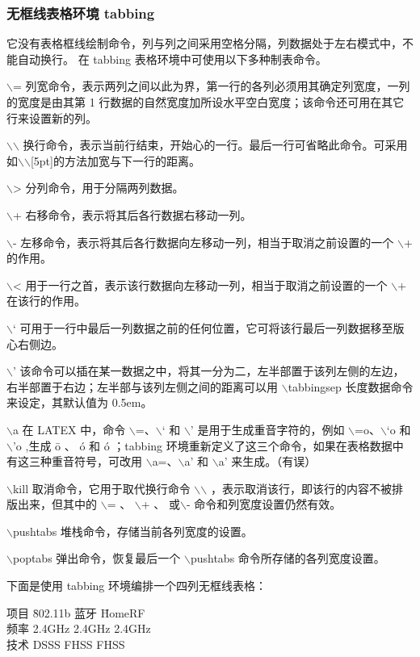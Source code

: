 \documentclass[presentation]{beamer}
\begin{document}
\begin{frame}[allowframebreaks]
  \frametitle{无框线表格环境 tabbing}%
它没有表格框线绘制命令，列与列之间采用空格分隔，列数据处于左右模式中，不能自动换行。
在 tabbing 表格环境中可使用以下多种制表命令。

$\backslash$=  列宽命令，表示两列之间以此为界，第一行的各列必须用其确定列宽度，一列的宽度是由其第 1 行数据的自然宽度加所设水平空白宽度；该命令还可用在其它行来设置新的列。

$\backslash$$\backslash$ 换行命令，表示当前行结束，开始心的一行。最后一行可省略此命令。可采用如$\backslash$$\backslash$[5pt]的方法加宽与下一行的距离。

$\backslash$>  分列命令，用于分隔两列数据。

$\backslash$+  右移命令，表示将其后各行数据右移动一列。

$\backslash$-  左移命令，表示将其后各行数据向左移动一列，相当于取消之前设置的一个 $\backslash$+ 的作用。

$\backslash$<  用于一行之首，表示该行数据向左移动一列，相当于取消之前设置的一个 $\backslash$+ 在该行的作用。

$\backslash$‘  可用于一行中最后一列数据之前的任何位置，它可将该行最后一列数据移至版心右侧边。

$\backslash$’  该命令可以插在某一数据之中，将其一分为二，左半部置于该列左侧的左边，右半部置于右边；左半部与该列左侧之间的距离可以用 $\backslash$tabbingsep 长度数据命令来设定，其默认值为 0.5em。

$\backslash$a  在 LATEX 中，命令 $\backslash$=、$\backslash$‘ 和 $\backslash$’ 是用于生成重音字符的，例如 $\backslash$=o、$\backslash$‘o 和 $\backslash$'o ,生成 \=o 、 \'o 和 \'o ；tabbing 环境重新定义了这三个命令，如果在表格数据中有这三种重音符号，可改用 $\backslash$a=、$\backslash$a’ 和 $\backslash$a’ 来生成。（有误）

$\backslash$kill  取消命令，它用于取代换行命令 $\backslash$$\backslash$ ，表示取消该行，即该行的内容不被排版出来，但其中的 $\backslash$= 、 $\backslash$+ 、 或$\backslash$- 命令和列宽度设置仍然有效。

$\backslash$pushtabs 堆栈命令，存储当前各列宽度的设置。

$\backslash$poptabs 弹出命令，恢复最后一个 $\backslash$pushtabs 命令所存储的各列宽度设置。

下面是使用 tabbing 环境编排一个四列无框线表格：
\begin{tabbing}
项目 \hspace{4mm} \= {\sf 802.11b} \hspace{4mm} \= 蓝牙 \hspace{10mm} \= {\sf HomeRF}\\
频率 \> 2.4GHz \> 2.4GHz \> 2.4GHz\\
技术 \> DSSS \> FHSS \> FHSS\\
\end{tabbing}


\end{frame}
\end{document}
